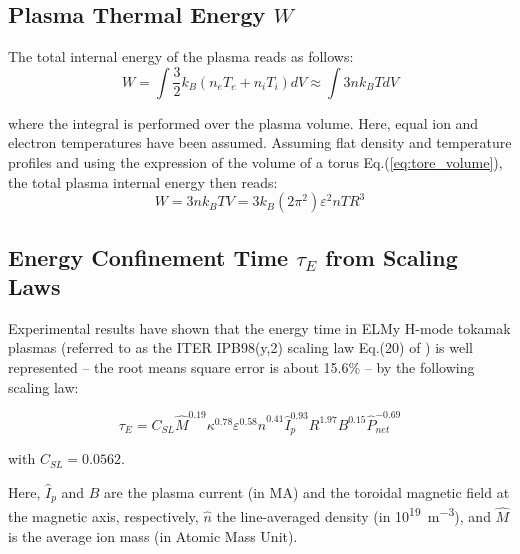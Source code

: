 \subsection{Plasma Thermal Energy $W$}
The total internal energy of the plasma reads as follows:
\begin{equation*}
W  = \int \frac{3}{2} k_B \left( n_e T_e + n_i T_i \right ) dV 
\approx \int 3 n k_BT dV
\end{equation*}

\noindent
where the integral is performed over the plasma volume. Here, equal ion and electron temperatures have been assumed. Assuming flat density and temperature profiles and using the expression of the volume of a torus Eq.(\ref{eq:tore_volume}), the total plasma internal energy then reads:
\begin{equation}
W = 3 n k_B T V = 3 k_B (2\pi^2) \varepsilon^2  n T R^3
\label{eq:total_energy_natural_units}
\end{equation}





\subsection{Energy Confinement Time $\tau_E$ from Scaling Laws}
Experimental results have shown that the energy time in ELMy H-mode tokamak plasmas (referred to as the ITER IPB98(y,2) scaling law Eq.(20) of ) is well represented -- the root means square error is about 15.6\% -- by the following scaling law:

\begin{equation}
	\tau_E = C_{SL} \hat M^{0.19} \kappa^{0.78} \varepsilon^{0.58} 
	\hat n^{0.41} \hat I_p^{0.93} R^{1.97} B^{0.15}  \hat P_{net}^{-0.69}
	\label{eq:scaling_law_IPB98(y,2)_adv}
\end{equation}

\noindent
with $C_{SL} = 0.0562$.


Here, $\hat I_p$ and $B$ are the plasma current (in \si{MA}) and the toroidal magnetic field at the magnetic axis, respectively, $\hat n$ the line-averaged density (in \si{10^{19}m^{-3}}), and $\hat M$ is the average ion mass (in Atomic Mass Unit). 





